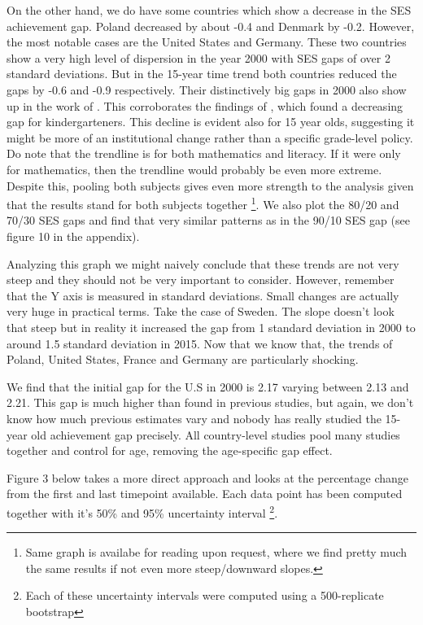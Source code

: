 \documentclass[11pt, a4paper]{article}\usepackage[]{graphicx}\usepackage[]{color}
\begin{document}
On the other hand, we do have some countries which show a decrease in the SES achievement gap. Poland decreased by about -0.4 and Denmark by -0.2. However, the most notable cases are the United States and Germany. These two countries show a very high level of dispersion in the year 2000 with SES gaps of over 2 standard deviations. But in the 15-year time trend both countries reduced the gaps by -0.6 and -0.9 respectively. Their distinctively big gaps in 2000 also show up in the work of \citet{micklewright}. This corroborates the findings of \citet{reardon_portilla}, which found a decreasing gap for kindergarteners. This decline is evident also for 15 year olds, suggesting it might be more of an institutional change rather than a specific grade-level policy. Do note that the trendline is for both mathematics and literacy. If it were only for mathematics, then the trendline would probably be even more extreme. Despite this, pooling both subjects gives even more strength to the analysis given that the results stand for both subjects together \footnote{Same graph is availabe for reading upon request, where we find pretty much the same results if not even more steep/downward slopes.}. We also plot the 80/20 and 70/30 SES gaps and find that very similar patterns as in the 90/10 SES gap (see figure 10 in the appendix).

Analyzing this graph we might naively conclude that these trends are not very steep and they should not be very important to consider. However, remember that the Y axis is measured in standard deviations. Small changes are actually very huge in practical terms. Take the case of Sweden. The slope doesn't look that steep but in reality it increased the gap from 1 standard deviation in 2000 to around 1.5 standard deviation in 2015. Now that we know that, the trends of Poland, United States, France and Germany are particularly shocking.



We find that the initial gap for the U.S in 2000 is 2.17 varying between 2.13 and 2.21. This gap is much higher than found in previous studies, but again, we don't know how much previous estimates vary and nobody has really studied the 15-year old achievement gap precisely. All country-level studies pool many studies together and control for age, removing the age-specific gap effect.

Figure 3 below takes a more direct approach and looks at the percentage change from the first and last timepoint available. Each data point has been computed together with it's 50\% and 95\% uncertainty interval \footnote{Each of these uncertainty intervals were computed using a 500-replicate bootstrap}.
\end{document}
